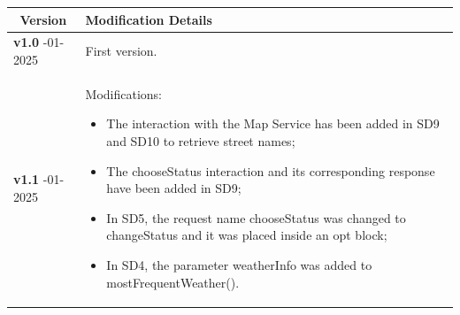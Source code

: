 \noindent
\begin{tabularx}{\textwidth}{ p{2.5cm} | X } 
    \hline
    \multicolumn{1}{c|}{\textbf{Version}} & \textbf{Modification Details} \\ 
    \hline
    
    \raggedleft \textbf{v1.0} \newline 7-01-2025 & First version. \\ 
    \hline
    
    \raggedleft \textbf{v1.1} \newline 25-01-2025 & Modifications:
    \begin{itemize}[leftmargin=*, nosep, after=\vspace{\baselineskip}]
        \item The interaction with the Map Service has been added in SD9 and SD10 to retrieve street names;
        \item The chooseStatus interaction and its corresponding response have been added in SD9;
        \item In SD5, the request name chooseStatus was changed to changeStatus and it was placed inside an opt block;
        \item In SD4, the parameter weatherInfo was added to mostFrequentWeather().
        
    \end{itemize} \\ 
    \hline
\end{tabularx}